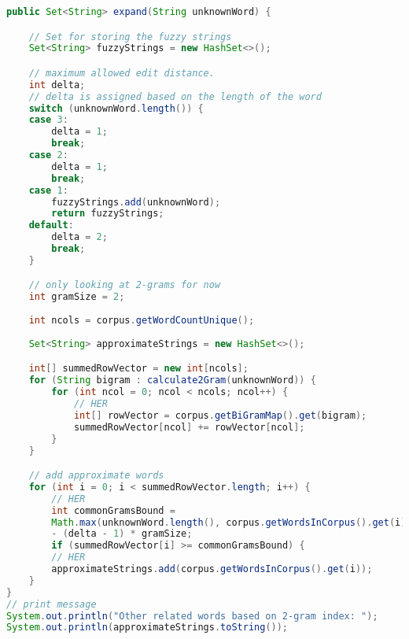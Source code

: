 \begin{lstlisting}[language=Java, caption=This is a code example., label=lst:2-gram]
public Set<String> expand(String unknownWord) {

	// Set for storing the fuzzy strings
	Set<String> fuzzyStrings = new HashSet<>();

	// maximum allowed edit distance.
	int delta;
	// delta is assigned based on the length of the word
	switch (unknownWord.length()) {
	case 3:
		delta = 1;
		break;
	case 2:
		delta = 1;
		break;
	case 1:
		fuzzyStrings.add(unknownWord);
		return fuzzyStrings;
	default:
		delta = 2;
		break;
	}

	// only looking at 2-grams for now
	int gramSize = 2;
	
	int ncols = corpus.getWordCountUnique();
	
	Set<String> approximateStrings = new HashSet<>();

	int[] summedRowVector = new int[ncols];
	for (String bigram : calculate2Gram(unknownWord)) {
		for (int ncol = 0; ncol < ncols; ncol++) {
			// HER
			int[] rowVector = corpus.getBiGramMap().get(bigram);
			summedRowVector[ncol] += rowVector[ncol];
		}
	}

	// add approximate words
	for (int i = 0; i < summedRowVector.length; i++) {
		// HER
		int commonGramsBound =
		Math.max(unknownWord.length(), corpus.getWordsInCorpus().get(i).length()) - 1
		- (delta - 1) * gramSize;
		if (summedRowVector[i] >= commonGramsBound) {
		// HER
		approximateStrings.add(corpus.getWordsInCorpus().get(i));
	}
}
// print message
System.out.println("Other related words based on 2-gram index: ");
System.out.println(approximateStrings.toString());
\end{lstlisting}


%	
%		



